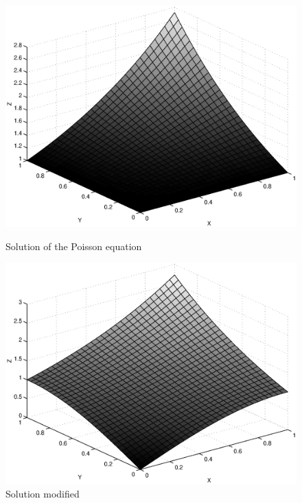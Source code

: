 \begin{figure}[ht] 
\begin{minipage}{0.5 \linewidth}
    \begin{center}
    \includegraphics [scale = 0.3]{images/eq-poisson.eps}
    \caption{Solution of the Poisson equation}
              \label{fig-eq-fish}
    \end{center}
\end{minipage}
\begin{minipage}{0.5 \linewidth}
    \begin{center}
    \includegraphics [scale = 0.3]{images/eq-poisson-modif.eps}
    \caption{Solution modified}
              \label{fig-eq-Poisson-modif}
    \end{center}
\end{minipage}
\end{figure}
 
